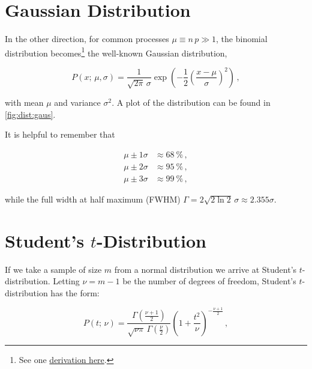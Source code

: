 \section{Gaussian Distribution}
\label{stats:gaus}

In the other direction, for common processes $\mu \equiv n\,p \gg 1$,
the binomial distribution becomes\footnote{See
one \href{http://scipp.ucsc.edu/~haber/ph116C/NormalApprox.pdf}{derivation here}.} the
well-known Gaussian distribution,

\begin{equation}\label{eq:stats:gaus:P}
P\left(x;\,\mu,\sigma\right) = \frac{1}{\sqrt{2\pi}\,\sigma} \exp\left( -\frac{1}{2} \left(\frac{x-\mu}{\sigma}\right)^{2} \right)\,,
\end{equation}

\noindent with mean $\mu$ and variance $\sigma^{2}$.
A plot of the distribution can be found in \cref{fig:dist:gaus}.

It is helpful to remember that

\begin{equation}\label{eq:stats:gaus:sigmas}
\begin{split}
\mu \pm 1\sigma &\approx \SI{68}{\percent}\,, \\
\mu \pm 2\sigma &\approx \SI{95}{\percent}\,, \\
\mu \pm 3\sigma &\approx \SI{99}{\percent}\,,
\end{split}
\end{equation}

\noindent while the full width at half maximum (FWHM) $\Gamma = 2\sqrt{2 \ln{2}}\,\sigma \approx \num{2.355} \sigma$.

\section{Student's \texorpdfstring{$t$}{t}-Distribution}
\label{stats:t_dist}

If we take a sample of size $m$ from a normal distribution
we arrive at Student's $t$-distribution.
Letting $\nu = m-1$ be the number of degrees of freedom,
Student's $t$-distribution has the form:

\begin{equation}\label{eq:stats:t_dist:P}
P\left(t;\,\nu\right) = \frac{
\Gamma\left(\frac{\nu+1}{2}\right)
}{
\sqrt{\nu \pi}\,\Gamma\left(\frac{\nu}{2}\right)
} \left(1+\frac{t^{2}}{\nu}\right)^{-\frac{\nu+1}{2}}\,,
\end{equation}

